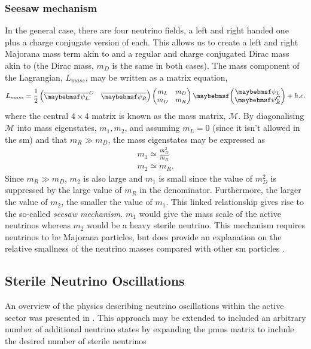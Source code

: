 \subsubsection{Seesaw mechanism}\label{sec:seesaw_mechanism}
In the general case, there are four neutrino fields, a left and right handed one plus a charge conjugate version of each. This allows us to create a left and right Majorana mass term akin to  and a regular and charge conjugated Dirac mass akin to  (the Dirac mass, $m_D$ is the same in both cases). The mass component of the Lagrangian, $L_{mass}$, may be written as a matrix equation, 
\begin{equation}
    L_{mass} = \frac{1}{2} 
    \begin{pmatrix}
    \overline{\psi_L}^C & \overline{\psi_R}
    \end{pmatrix}
    \begin{pmatrix}
    m_L & m_D \\
    m_D & m_R
    \end{pmatrix}
    \twomatrix {\psi_L} {\psi_R^C} + h.c.
\end{equation}
where the central $4 \times 4$ matrix is known as the mass matrix, $\mathcal{M}$. By diagonalising $\mathcal{M}$ into mass eigenstates, $m_1, m_2$, and assuming $m_L = 0$ (since it isn't allowed in the \gls{sm}) and that $m_R \gg m_D$, the mass eigenstates may be expressed as
\begin{equation}
\begin{split}
    m_1 \simeq \frac{m_D^2}{m_R} \\
    m_2 \simeq m_R.
\end{split}
\end{equation}
Since $m_R \gg m_D$, $m_2$ is also large and $m_1$ is small since the value of $m_D^2$ is suppressed by the large value of $m_R$ in the denominator. Furthermore, the larger the value of $m_2$, the smaller the value of $m_1$. This linked relationship gives rise to the so-called \textit{seesaw mechanism}. $m_1$ would give the mass scale of the active neutrinos whereas $m_2$ would be a heavy sterile neutrino. This mechanism requires neutrinos to be Majorana particles, but does provide an explanation on the relative smallness of the neutrino masses compared with other \gls{sm} particles \cite{Fundamentals_of_Neutrino_Physics_and_Astrophysics}. 


\subsection{Sterile Neutrino Oscillations}\label{sec:sterile_neutrino_oscillations}
An overview of the physics describing neutrino oscillations within the active sector was presented in . This approach may be extended to included an arbitrary number of additional neutrino states by expanding the \gls{pmns} matrix to include the desired number of sterile neutrinos


